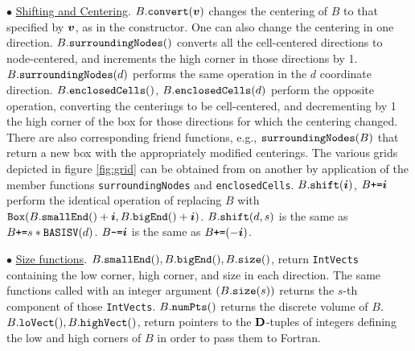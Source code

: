 \begin{trivlist}
\item $\bullet$ \underline{Shifting and Centering}.
$B.{\tt{convert}}({\boldsymbol{v}})$ changes the centering
of $B$ to that specified by ${\boldsymbol{v}}$, as in the constructor.
One can also change the centering in one direction.
$B.{\tt{surroundingNodes}}()$ converts all the cell-centered
directions to node-centered, and increments the high corner in those
directions by 1.  $B.{\tt{surroundingNodes}}(d)$ performs the same
operation in the $d$ coordinate direction.  $B.{\tt{enclosedCells}}()$,
$B.{\tt{enclosedCells}}(d)$ perform the opposite operation, converting
the centerings to be cell-centered, and decrementing by 1 the high
corner of the box for those directions for which the centering
changed.  There are also corresponding friend functions,
e.g., ${\tt{surroundingNodes}}(B)$ that return a new box with the
appropriately modified centerings.  
The various grids depicted in figure \ref{fig:grid} can be obtained from
on another by application of the member functions 
{\tt surroundingNodes} and {\tt enclosedCells}.
$B.{\tt{shift}}({\boldsymbol{i}})$, $B \mbox{\tt{+=}}
{\boldsymbol{i}}$ perform the identical operation of replacing $B$ with
${\tt{Box}}(B.{\tt{smallEnd}}() + {\boldsymbol{i}}, B.{\tt{bigEnd}}() +
{\boldsymbol{i}})$.  $B.{\tt{shift}}(d, s)$ is the same as $B \mbox{\tt{+=}} s*{\tt{BASISV}}(d)$.
$B \mbox{\tt{-=}} {\boldsymbol{i}}$ is the same as $B \mbox{\tt{+=}} (-{\boldsymbol{i}})$.

\item $\bullet$ \underline{Size functions}.  $B.{\tt{smallEnd}}(), B.{\tt{bigEnd}}(),
B.{\tt{size}}()$, return {\tt{IntVects}} containing the low corner,
high corner, and size in each direction.  The same functions called
with an integer argument $(B.{\tt{size}}(s))$ returns the $s$-th
component of those {\tt{IntVects}}.  $B.{\tt{numPts}}()$ returns the
discrete volume of $B$.  $B.{\tt{loVect()}}, B.{\tt{highVect()}}$,
return pointers to the ${\mathbf{D}}$-tuples of integers defining the low and high
corners of $B$ in order to pass them to Fortran.


\end{trivlist}
